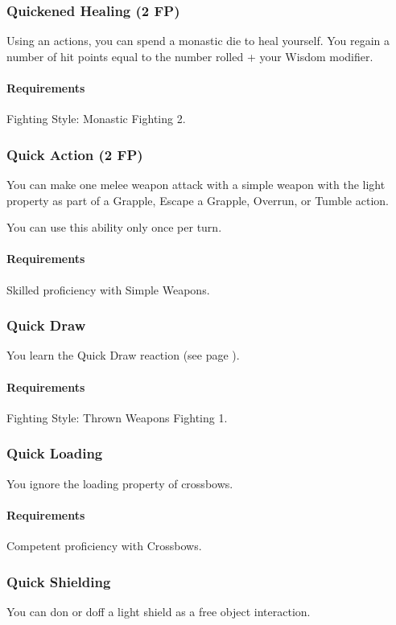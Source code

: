 \subsubsection{Quickened Healing (2 FP)} \label{feat::quickenedhealing}
    Using an actions, you can spend a monastic die to heal yourself.
    You regain a number of hit points equal to the number rolled + your Wisdom modifier.
    \paragraph{Requirements} Fighting Style: Monastic Fighting 2.
\subsubsection{Quick Action (2 FP)} \label{feat::quickaction}
    You can make one melee weapon attack with a simple weapon with the light property as part of a Grapple, Escape a Grapple, Overrun, or Tumble action.

    You can use this ability only once per turn.
    \paragraph{Requirements} Skilled proficiency with Simple Weapons.
\subsubsection{Quick Draw} \label{feat::quickdraw}
    You learn the Quick Draw reaction (see page \pageref{act::quickdraw}).
    \paragraph{Requirements} Fighting Style: Thrown Weapons Fighting 1.
\subsubsection{Quick Loading} \label{feat::quickloading}
    You ignore the loading property of crossbows.
    \paragraph{Requirements} Competent proficiency with Crossbows.
\subsubsection{Quick Shielding} \label{feat::quickshielding}
    You can don or doff a light shield as a free object interaction.
